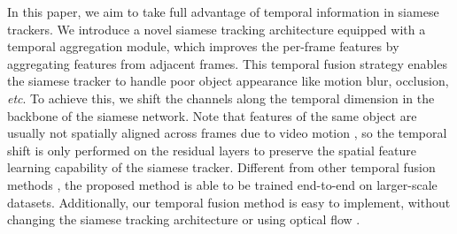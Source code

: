 \documentclass{article}
\begin{document}
In this paper, we aim to take full advantage of temporal information in siamese trackers.
We introduce a novel siamese tracking architecture equipped with a temporal aggregation module, which improves the per-frame features by aggregating features from adjacent frames.
This temporal fusion strategy enables the siamese tracker to handle poor object appearance like motion blur, occlusion, \textit{etc}.
To achieve this, we shift the channels along the temporal dimension \cite{lin2019tsm} in the backbone of the siamese network.
Note that features of the same object are usually not spatially aligned across frames due to video motion \cite{zhu2017flow}, so the temporal shift is only performed on the residual layers \cite{lin2019tsm} to preserve the spatial feature learning capability of the siamese tracker.
Different from other temporal fusion methods \cite{tao2016siamese, gladh2016deep}, the proposed method is able to be trained end-to-end on larger-scale datasets.
Additionally, our temporal fusion method is easy to implement, without changing the siamese tracking architecture or using optical flow \cite{zhu2018end}.
\end{document}

